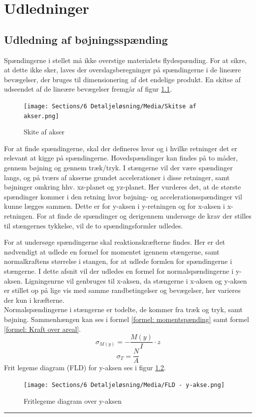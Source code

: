 \chapter{Udledninger}  \label{bilag- statik udledning}

\section{Udledning af bøjningsspænding}  \label{bilag - Bøjningsspænding}

Spændingerne i stellet må ikke overstige materialets flydespænding. For at sikre, at dette ikke sker, laves der overslagsberegninger på spændingerne i de lineære bevægelser, der bruges til dimensionering af det endelige produkt. En skitse af udseendet af de lineære bevægelser fremgår af figur \ref{Skite af akser}.

\begin{figure}[H]
    \centering
    \texttt{[image: Sections/6 Detaljeløsning/Media/Skitse af akser.png]}
    \caption{Skite af akser}
    \label{Skite af akser}
\end{figure}

For at finde spændingerne, skal der defineres hvor og i hvilke retninger det er relevant at kigge på spændingerne. Hovedspændinger kan findes på to måder, gennem bøjning og gennem træk/tryk. I stængerne vil der være spændinger langs, og på tværs af akserne grundet accelerationer i disse retninger, samt bøjninger omkring hhv. xz-planet og yz-planet. Her vurderes det, at de største spændinger kommer i den retning hvor bøjning- og accelerationsspændinger vil kunne lægges sammen. Dette er for y-aksen i y-retningen og for x-aksen i x-retningen. For at finde de spændinger og derigennem undersøge de krav der stilles til stængernes tykkelse, vil de to spændingsformler udledes. 

For at undersøge spændingerne skal reaktionskræfterne findes. Her er det nødvendigt at udlede en formel for momentet igennem stængerne, samt normalkraftens størrelse i stangen, for at udlede formlen for spændingerne i stængerne. I dette afsnit vil der udledes en formel for normalspændingerne i y-aksen. Ligningenrne vil genbruges til x-aksen, da stængerne i x-aksen og y-aksen er stillet op på lige vis med samme randbetingelser og bevægelser, her varieres der kun i kræfterne.\\
Normalspændingerne i stængerne er todelte, de kommer fra træk og tryk, samt bøjning. Sammenhængen kan ses i formel \ref{formel: momentspænding} samt formel \ref{formel: Kraft over areal}.
\begin{equation} \label{formel: momentspænding}
    \sigma_{M(y)} = -\frac{M(y)}{I}\cdot z
\end{equation}
\begin{equation}\label{formel: Kraft over areal}
    \sigma_T=\frac{N}{A}
\end{equation}
Frit legeme diagram (FLD) for y-aksen ses i figur \ref{fig: FLD y}.
\begin{figure}[H]
    \centering
    \texttt{[image: Sections/6 Detaljeløsning/Media/FLD - y-akse.png]}
    \caption{Fritlegeme diagram over y-aksen}
    \label{fig: FLD y}
\end{figure} \plainbreak{-0.5}

